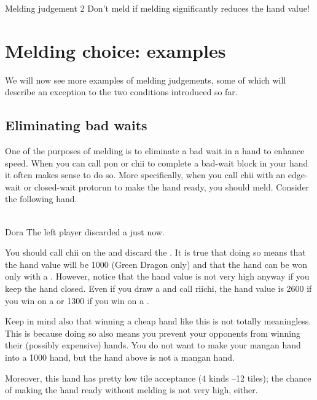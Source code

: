 \bigskip
\begin{itembox}[c]{Melding judgement 2}
Don't meld if melding significantly reduces the hand value!
\end{itembox}

\bigskip
\section{Melding choice: examples}
We will now see more examples of melding judgements, some of which will describe an exception to the two conditions introduced so far. 

\subsection{Eliminating bad waits}
One of the purposes of melding is to eliminate a bad wait in a hand to enhance speed. When you can call {\jap pon} or {\jap chii} to complete a bad-wait block in your hand it often makes sense to do so. More specifically, when you call {\jap chii} with an edge-wait or closed-wait protorun to make the hand ready, you should meld. Consider the following hand.

\begin{screen}
\bp
{}\fa\fa~~\xi\\
\hspace{295pt}\footnotesize{\jap Dora}
\ep
\vspace{-20pt}The left player discarded a {\large{}} just now.
\end{screen}
\noindent
You should call {\jap chii} on the {\large{}} and discard the {\large{}}. It is true that doing so means that the hand value will be 1000 (Green Dragon only) and that the hand can be won only with a {\large\fa}. However, notice that the hand value is not very high anyway if you keep the hand closed. Even if you draw a {\large{}} and call {\jap riichi}, the hand value is 2600 if you win on a {\large\fa} or 1300 if you win on a {\large{}}. 

\bigskip
Keep in mind also that winning a cheap hand like this is not totally meaningless.  This is because doing so also means you prevent your opponents from winning their (possibly expensive) hands. You do not want to make your {\jap mangan} hand into a 1000 hand, but the hand above is not a {\jap mangan} hand.

\bigskip
Moreover, this hand has pretty low tile acceptance (4 kinds {\large{}\fa}--12 tiles); the chance of making the hand ready without melding is not very high, either. 


